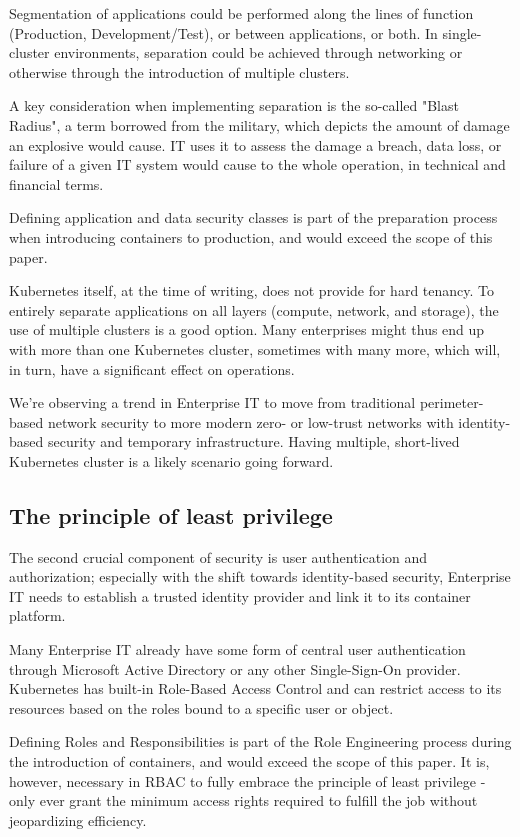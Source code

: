 Segmentation of applications could be performed along the lines of function (Production, Development/Test), or between applications, or both. In single-cluster environments, separation could be achieved through networking or otherwise through the introduction of multiple clusters. 

A key consideration when implementing separation is the so-called "Blast Radius", a term borrowed from the military, which depicts the amount of damage an explosive would cause. IT uses it to assess the damage a breach, data loss, or failure of a given IT system would cause to the whole operation, in technical and financial terms.

Defining application and data security classes is part of the preparation process when introducing containers to production, and would exceed the scope of this paper.

Kubernetes itself, at the time of writing, does not provide for hard tenancy. To entirely separate applications on all layers (compute, network, and storage), the use of multiple clusters is a good option. Many enterprises might thus end up with more than one Kubernetes cluster, sometimes with many more, which will, in turn, have a significant effect on operations.

We're observing a trend in Enterprise IT to move from traditional perimeter-based network security to more modern zero- or low-trust networks with identity-based security and temporary infrastructure. Having multiple, short-lived Kubernetes cluster is a likely scenario going forward.

\subsection{The principle of least privilege}

The second crucial component of security is user authentication and authorization; especially with the shift towards identity-based security, Enterprise IT needs to establish a trusted identity provider and link it to its container platform.

Many Enterprise IT already have some form of central user authentication through Microsoft Active Directory or any other Single-Sign-On provider. Kubernetes has built-in Role-Based Access Control and can restrict access to its resources based on the roles bound to a specific user or object.

Defining Roles and Responsibilities is part of the Role Engineering process during the introduction of containers, and would exceed the scope of this paper. It is, however, necessary in RBAC to fully embrace the principle of least privilege - only ever grant the minimum access rights required to fulfill the job without jeopardizing efficiency. 

